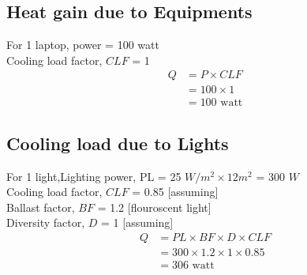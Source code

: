 \documentclass{article}
\begin{document}
    \subsection{Heat gain due to Equipments}
    For 1 laptop, power = 100 watt \\
    Cooling load factor, $CLF$ = 1 \\

    \begin{align*}
      Q &= P \times CLF \\
      &= 100 \times 1 \\
      &= 100 \text{ watt}
    \end{align*}

    \subsection{Cooling load due to Lights}
    For 1 light,Lighting power, PL = 25 $W/m^2 \times 12 m^2$ = 300 $W$ \\
    Cooling load factor, $CLF$ = 0.85 [assuming] \\
    Ballast factor, $BF$ = 1.2 [flouroscent light] \\
    Diversity factor, $D$ = 1  [assuming]\\

    \begin{align*}
      Q &= PL \times BF \times D \times CLF \\
      &= 300 \times 1.2 \times 1 \times 0.85 \\
      &= 306 \text{ watt}
    \end{align*}
    \vspace*{1cm}
\end{document}
